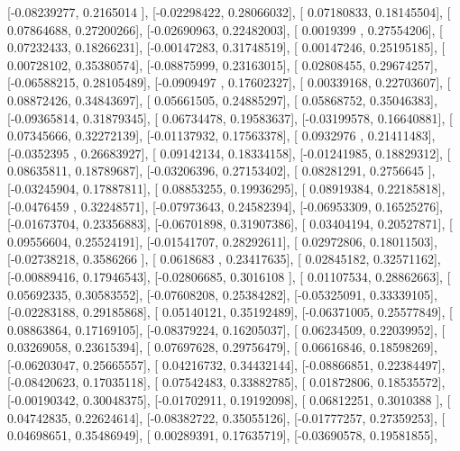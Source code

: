 \documentclass{article}
\begin{document}
       [-0.08239277,  0.2165014 ],
       [-0.02298422,  0.28066032],
       [ 0.07180833,  0.18145504],
       [ 0.07864688,  0.27200266],
       [-0.02690963,  0.22482003],
       [ 0.0019399 ,  0.27554206],
       [ 0.07232433,  0.18266231],
       [-0.00147283,  0.31748519],
       [ 0.00147246,  0.25195185],
       [ 0.00728102,  0.35380574],
       [-0.08875999,  0.23163015],
       [ 0.02808455,  0.29674257],
       [-0.06588215,  0.28105489],
       [-0.0909497 ,  0.17602327],
       [ 0.00339168,  0.22703607],
       [ 0.08872426,  0.34843697],
       [ 0.05661505,  0.24885297],
       [ 0.05868752,  0.35046383],
       [-0.09365814,  0.31879345],
       [ 0.06734478,  0.19583637],
       [-0.03199578,  0.16640881],
       [ 0.07345666,  0.32272139],
       [-0.01137932,  0.17563378],
       [ 0.0932976 ,  0.21411483],
       [-0.0352395 ,  0.26683927],
       [ 0.09142134,  0.18334158],
       [-0.01241985,  0.18829312],
       [ 0.08635811,  0.18789687],
       [-0.03206396,  0.27153402],
       [ 0.08281291,  0.2756645 ],
       [-0.03245904,  0.17887811],
       [ 0.08853255,  0.19936295],
       [ 0.08919384,  0.22185818],
       [-0.0476459 ,  0.32248571],
       [-0.07973643,  0.24582394],
       [-0.06953309,  0.16525276],
       [-0.01673704,  0.23356883],
       [-0.06701898,  0.31907386],
       [ 0.03404194,  0.20527871],
       [ 0.09556604,  0.25524191],
       [-0.01541707,  0.28292611],
       [ 0.02972806,  0.18011503],
       [-0.02738218,  0.3586266 ],
       [ 0.0618683 ,  0.23417635],
       [ 0.02845182,  0.32571162],
       [-0.00889416,  0.17946543],
       [-0.02806685,  0.3016108 ],
       [ 0.01107534,  0.28862663],
       [ 0.05692335,  0.30583552],
       [-0.07608208,  0.25384282],
       [-0.05325091,  0.33339105],
       [-0.02283188,  0.29185868],
       [ 0.05140121,  0.35192489],
       [-0.06371005,  0.25577849],
       [ 0.08863864,  0.17169105],
       [-0.08379224,  0.16205037],
       [ 0.06234509,  0.22039952],
       [ 0.03269058,  0.23615394],
       [ 0.07697628,  0.29756479],
       [ 0.06616846,  0.18598269],
       [-0.06203047,  0.25665557],
       [ 0.04216732,  0.34432144],
       [-0.08866851,  0.22384497],
       [-0.08420623,  0.17035118],
       [ 0.07542483,  0.33882785],
       [ 0.01872806,  0.18535572],
       [-0.00190342,  0.30048375],
       [-0.01702911,  0.19192098],
       [ 0.06812251,  0.3010388 ],
       [ 0.04742835,  0.22624614],
       [-0.08382722,  0.35055126],
       [-0.01777257,  0.27359253],
       [ 0.04698651,  0.35486949],
       [ 0.00289391,  0.17635719],
       [-0.03690578,  0.19581855],
\end{document}

